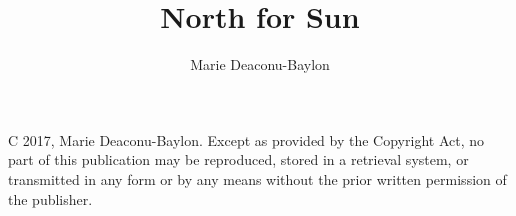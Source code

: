 \documentclass[openany,10pt]{memoir}
\author{Marie Deaconu-Baylon}
\title{North for Sun}
\date{}
\begin{document}
\frontmatter
\clearpage
\maketitle 
\thispagestyle{empty}
\clearpage


\textcircled{\tiny{C}} 2017, Marie Deaconu-Baylon.  Except as provided by the Copyright Act, no part of this publication may be reproduced, stored in a retrieval system, or transmitted in any form or by any means without the prior written permission of the publisher. 


\clearpage 
 
\clearpage

\mainmatter
{}


 
\backmatter
\newpage
\newpage
{}

\newpage\null\thispagestyle{empty}\newpage

\setlength{\parskip}{8pt}
\setlength{\parindent}{0pt}

\newpage
\null
 
\end{document}
